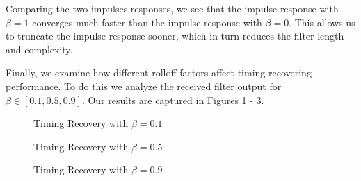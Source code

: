 \documentclass{article}
\begin{document}
\noindent Comparing the two impulses responses, we see that the impulse response with $\beta=1$ converges much faster than the impulse response with $\beta=0$. This allows us to truncate the impulse response sooner, which in turn reduces the filter length and complexity.

Finally, we examine how different rolloff factors affect timing recovering performance. To do this we analyze the received filter output for $\beta \in [0.1, 0.5, 0.9]$. Our results are captured in Figures \ref{fig::timing_recovery_beta_0_1} - \ref{fig::timing_recovery_beta_0_9}.

\begin{figure}[H]
	\centerline{}
	\caption{Timing Recovery with $\beta=0.1$}
	\label{fig::timing_recovery_beta_0_1}
\end{figure}

\begin{figure}[H]
	\centerline{}
	\caption{Timing Recovery with $\beta=0.5$}
	\label{fig::timing_recovery_beta_0_5}
\end{figure}

\begin{figure}[H]
	\centerline{}
	\caption{Timing Recovery with $\beta=0.9$}
	\label{fig::timing_recovery_beta_0_9}
\end{figure}
\end{document}
